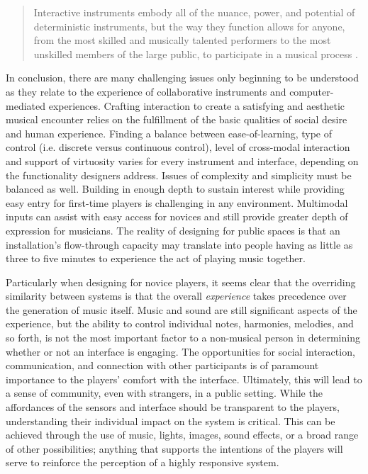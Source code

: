 \begin{quotation}
Interactive instruments embody all of the nuance, power, and potential
of deterministic instruments, but the way they function allows for anyone, from
the most skilled and musically talented performers to the most unskilled members
of the large public, to participate in a musical process \cite{Chadabe:2002}.
\end{quotation}

In conclusion, there are many challenging issues only beginning to be understood
as they relate to the experience of collaborative instruments and
computer-mediated experiences. Crafting interaction to create a satisfying and
aesthetic musical encounter relies on the fulfillment of the basic qualities of
social desire and human experience.  Finding a balance between ease-of-learning,
type of control (i.e. discrete versus continuous control), level of cross-modal
interaction and support of virtuosity varies for every instrument and interface,
depending on the functionality designers address. Issues of complexity and
simplicity must be balanced as well. Building in enough depth to sustain interest
while providing easy entry for first-time players is challenging in any
environment. Multimodal inputs can assist with easy access for novices and still
provide greater depth of expression for musicians. The reality of designing for
public spaces is that an installation's flow-through capacity may translate into
people having as little as three to five minutes to experience the act of playing
music together.

Particularly when designing for novice players, it seems clear that the
overriding similarity between systems is that the overall \textit{experience}
takes precedence over the generation of music itself.  Music and sound are still
significant aspects of the experience, but the ability to control individual
notes, harmonies, melodies, and so forth, is not the most important factor to a
non-musical person in determining whether or not an interface is engaging.  The
opportunities for social interaction, communication, and connection with other
participants is of paramount importance to the players' comfort with the
interface. Ultimately, this will lead to a sense of community, even with
strangers, in a public setting.   While the affordances of the sensors and
interface should be transparent to the players, understanding their individual
impact on the system is critical.  This can be achieved through the use of music,
lights, images, sound effects, or a broad range of other possibilities; anything
that supports the intentions of the players will serve to reinforce the
perception of a highly responsive system.

